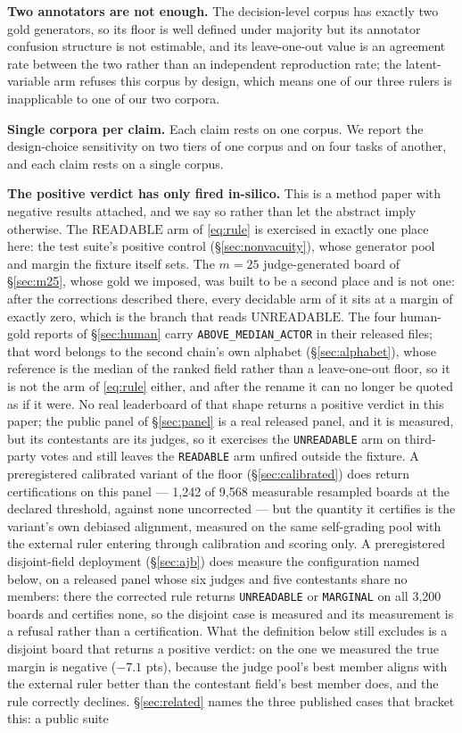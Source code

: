 \documentclass{article}
\begin{document}
\textbf{Two annotators are not enough.} The decision-level corpus has exactly two gold generators, so its floor is well defined under majority but its annotator confusion structure is not estimable, and its leave-one-out value is an agreement rate between the two rather than an independent reproduction rate; the latent-variable arm refuses this corpus by design, which means one of our three rulers is inapplicable to one of our two corpora.

\textbf{Single corpora per claim.} Each claim rests on one corpus. We report the design-choice sensitivity on two tiers of one corpus and on four tasks of another, and each claim rests on a single corpus.

\textbf{The positive verdict has only fired in-silico.} This is a method paper with negative results attached, and we say so rather than let the abstract imply otherwise. The $\mathrm{READABLE}$ arm of \eqref{eq:rule} is exercised in exactly one place here: the test suite's positive control (\S\ref{sec:nonvacuity}), whose generator pool and margin the fixture itself sets. The $m=25$ judge-generated board of \S\ref{sec:m25}, whose gold we imposed, was built to be a second place and is not one: after the corrections described there, every decidable arm of it sits at a margin of exactly zero, which is the branch that reads $\mathrm{UNREADABLE}$. The four human-gold reports of \S\ref{sec:human} carry \texttt{ABOVE\_MEDIAN\_ACTOR} in their released files; that word belongs to the second chain's own alphabet (\S\ref{sec:alphabet}), whose reference is the median of the ranked field rather than a leave-one-out floor, so it is not the arm of \eqref{eq:rule} either, and after the rename it can no longer be quoted as if it were. No real leaderboard of that shape returns a positive verdict in this paper; the public panel of \S\ref{sec:panel} is a real released panel, and it is measured, but its contestants are its judges, so it exercises the \texttt{UNREADABLE} arm on third-party votes and still leaves the \texttt{READABLE} arm unfired outside the fixture. A preregistered calibrated variant of the floor (\S\ref{sec:calibrated}) does return certifications on this panel --- 1,242 of 9,568 measurable resampled boards at the declared threshold, against none uncorrected --- but the quantity it certifies is the variant's own debiased alignment, measured on the same self-grading pool with the external ruler entering through calibration and scoring only. A preregistered disjoint-field deployment (\S\ref{sec:ajb}) does measure the configuration named below, on a released panel whose six judges and five contestants share no members: there the corrected rule returns \texttt{UNREADABLE} or \texttt{MARGINAL} on all 3,200 boards and certifies none, so the disjoint case is measured and its measurement is a refusal rather than a certification. What the definition below still excludes is a disjoint board that returns a positive verdict: on the one we measured the true margin is negative ($-7.1$ pts), because the judge pool's best member aligns with the external ruler better than the contestant field's best member does, and the rule correctly declines. \S\ref{sec:related} names the three published cases that bracket this: a public suite 
\end{document}
